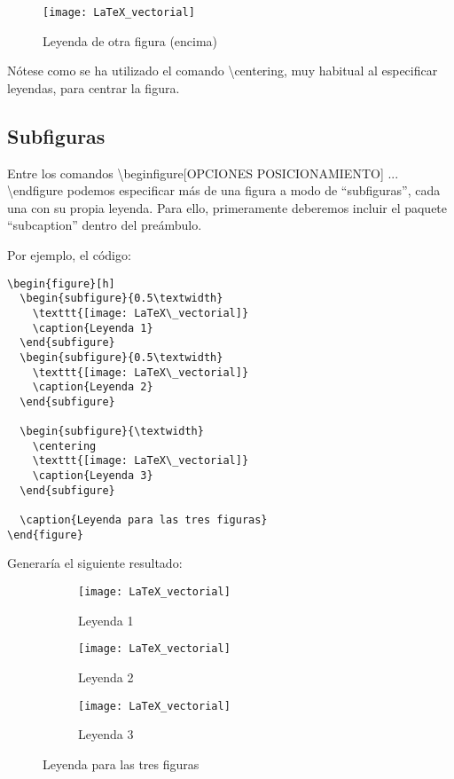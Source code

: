 \begin{figure}[h]
  \caption{Leyenda de otra figura (encima)}	
  \centering
  \texttt{[image: LaTeX\_vectorial]}
\end{figure}

Nótese como se ha utilizado el comando \textbackslash centering, muy habitual al especificar leyendas, para centrar la figura.

\subsection{Subfiguras}

Entre los comandos \textbackslash begin{figure}[OPCIONES POSICIONAMIENTO] ... \textbackslash end{figure} podemos especificar más de una figura a modo de ``subfiguras'', cada una con su propia leyenda. Para ello, primeramente deberemos incluir el paquete ``subcaption'' dentro del preámbulo.

Por ejemplo, el código:

\begin{lstlisting}
\begin{figure}[h]
  \begin{subfigure}{0.5\textwidth}
    \texttt{[image: LaTeX\_vectorial]}
    \caption{Leyenda 1}
  \end{subfigure}
  \begin{subfigure}{0.5\textwidth}
    \texttt{[image: LaTeX\_vectorial]}
    \caption{Leyenda 2}
  \end{subfigure}
	
  \begin{subfigure}{\textwidth}
    \centering
    \texttt{[image: LaTeX\_vectorial]}
    \caption{Leyenda 3}
  \end{subfigure}

  \caption{Leyenda para las tres figuras}
\end{figure}
\end{lstlisting}

Generaría el siguiente resultado:

\begin{figure}[h]
	\begin{subfigure}{0.5\textwidth}
		\texttt{[image: LaTeX\_vectorial]} 
		\caption{Leyenda 1}
	\end{subfigure}
	\begin{subfigure}{0.5\textwidth}
		\texttt{[image: LaTeX\_vectorial]}
		\caption{Leyenda 2}
	\end{subfigure}
	
	\begin{subfigure}{\textwidth}
		\centering
		\texttt{[image: LaTeX\_vectorial]}
		\caption{Leyenda 3}
	\end{subfigure}

	\caption{Leyenda para las tres figuras}
\end{figure}

